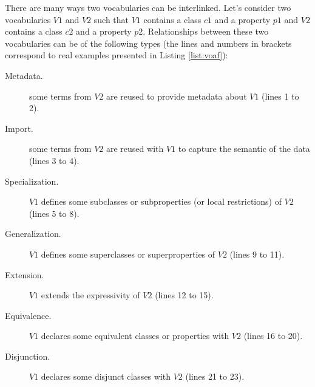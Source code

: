 \documentclass{iosart2c}
\begin{document}
There are many ways two vocabularies can be interlinked. Let's consider two vocabularies $V1$ and $V2$ such that $V1$ contains a class $c1$ and a property $p1$ and $V2$ contains a class $c2$ and a property $p2$. Relationships between these two vocabularies can be of the following types (the lines and numbers in brackets correspond to real examples presented in Listing \ref{list:voaf}):
		\begin{description}
			\item [Metadata.] some terms from $V2$ are reused to provide metadata about $V1$ (lines 1 to 2).

			\item [Import.] some terms from $V2$ are reused with $V1$ to capture the semantic of the data (lines 3 to 4).

			\item [Specialization.] $V1$ defines some subclasses or subproperties (or local restrictions) of $V2$ (lines 5 to 8).

			\item [Generalization.] $V1$ defines some superclasses or superproperties of $V2$ (lines 9 to 11).

			\item [Extension.] $V1$ extends the expressivity of $V2$ (lines 12 to 15).

			\item [Equivalence.] $V1$ declares some equivalent classes or properties with $V2$ (lines 16 to 20).

			\item [Disjunction.] $V1$ declares some disjunct classes with $V2$ (lines 21 to 23).
		\end{description}
\end{document}
